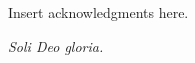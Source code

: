 \begin{acknowledgments}
  Insert acknowledgments here.

  \vfill \centering
    \emph{Soli Deo gloria.}
  \vfill
\end{acknowledgments}
